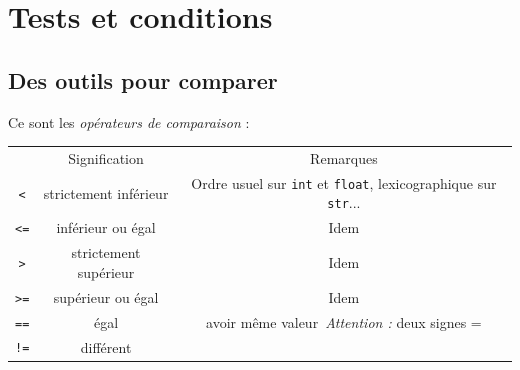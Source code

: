 \chapter{Tests et conditions}
\section{Des outils pour comparer}

Ce sont les \textit{opérateurs de comparaison} :\\

{\small
\alternaterowcolors
\begin{tabular}{ccc}
	\rowcolor{lightgray}
	\rowcolor{UGLiOrange}{\boxfont\color{white} Opérateur} & {\boxfont\color{white} Signification} & {\boxfont\color{white} Remarques}                                                                     \\

	\texttt{<}                                       & strictement inférieur                 & Ordre usuel sur \texttt{int} et \texttt{float}, lexicographique sur \texttt{str}... \\

	\texttt{<=}                                      & inférieur ou égal                     & Idem                                                                                                  \\

	\texttt{>}                                       & strictement supérieur                 & Idem                                                                                                  \\

	\texttt{>=}                                      & supérieur ou égal                     & Idem                                                                                                  \\

	\texttt{==}                                      & égal                                  & \og avoir même valeur\fg\  \textit{Attention :} deux signes =                                         \\

	\texttt{!=}                                      & différent                             &                                                                                                       \\


\end{tabular}}

